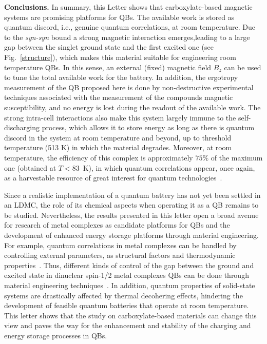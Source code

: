 \documentclass[aps,prl,epsfigure,twocolumn,superscriptaddress]{revtex4-1}
\newcommand{\1}{\mathbbm{1}}
\begin{document}
\textbf{Conclusions.} In summary, this Letter shows that carboxylate-based magnetic systems are promising platforms for QBs. The available work is stored as quantum discord, i.e., genuine quantum correlations, at room temperature. Due to the \textit{syn-syn} bound a strong magnetic interaction emerges,leading to a large gap between the singlet ground state and the first excited one (see Fig.~\ref{structure}), which makes this material suitable for engineering room temperature QBs. In this sense, an external (fixed) magnetic field $B_z$ can be used to tune the total available work for the battery. In addition, the ergotropy measurement of the QB proposed here is done by non-destructive experimental techniques associated with the measurement of the compounds magnetic susceptibility, and no energy is lost during the readout of the available work. The strong intra-cell interactions also make this system largely immune to the self-discharging process, which allows it to store energy as long as there is quantum discord in the system at room temperature and beyond, up to threshold temperature (513 K) in which the material degrades. Moreover, at room temperature, the efficiency of this complex is approximately $75\%$ of the maximum one (obtained at $T\!<\!83$~K), in which quantum correlations appear, once again, as a harvestable resource of great interest for quantum technologies~\cite{Sapienza:19}.

Since a realistic implementation of a quantum battery has not yet been settled in an LDMC, the role of its chemical aspects when operating it as a QB remains to be studied. Nevertheless, the results presented in this letter open a broad avenue for research of metal complexes as candidate platforms for QBs and the development of enhanced energy storage platforms through material engineering. For example, quantum correlations in metal complexes can be handled by controlling external parameters, as structural factors and thermodynamic properties~\cite{wasielewski2020exploiting,kova2020unconventional,cruz2017influence,cruz2020quantifying}. Thus, different kinds of control of the gap between the ground and excited state in dinuclear spin-1/2 metal complexes QBs can be done through material engineering techniques~\cite{gaita2019molecular,moreno2018molecular,wasielewski2020exploiting}. In addition, quantum properties of solid-state systems are drastically affected by thermal decohering effects, hindering the development of feasible quantum batteries that operate at room temperature. This letter shows that the study on carboxylate-based materials can change this view and paves the way for the enhancement and stability of the charging and energy storage processes in QBs.
\end{document}
